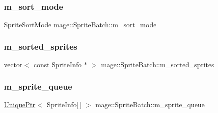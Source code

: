 \hypertarget{classmage_1_1_sprite_batch_a0b2b16b0d9eb63501b6fc0f9ce85e022}{}\label{classmage_1_1_sprite_batch_a0b2b16b0d9eb63501b6fc0f9ce85e022} 
\subsubsection{\texorpdfstring{m\+\_\+sort\+\_\+mode}{m\_sort\_mode}}
{\footnotesize\ttfamily \hyperlink{namespacemage_a256fa5833eecc408923de7ffadb5e014}{Sprite\+Sort\+Mode} mage\+::\+Sprite\+Batch\+::m\+\_\+sort\+\_\+mode\hspace{0.3cm}{\ttfamily [private]}}

\hypertarget{classmage_1_1_sprite_batch_a65ad09d31c928ab1522d8b2c0c509b9a}{}\label{classmage_1_1_sprite_batch_a65ad09d31c928ab1522d8b2c0c509b9a} 
\subsubsection{\texorpdfstring{m\+\_\+sorted\+\_\+sprites}{m\_sorted\_sprites}}
{\footnotesize\ttfamily vector$<$ const Sprite\+Info $\ast$ $>$ mage\+::\+Sprite\+Batch\+::m\+\_\+sorted\+\_\+sprites\hspace{0.3cm}{\ttfamily [private]}}

\hypertarget{classmage_1_1_sprite_batch_a67ab116e403b626771f03f527efa6f2f}{}\label{classmage_1_1_sprite_batch_a67ab116e403b626771f03f527efa6f2f} 
\subsubsection{\texorpdfstring{m\+\_\+sprite\+\_\+queue}{m\_sprite\_queue}}
{\footnotesize\ttfamily \hyperlink{namespacemage_a8c307fbcc33bce9b7f2aa4c26c3b95cf}{Unique\+Ptr}$<$ Sprite\+Info\mbox{[}$\,$\mbox{]} $>$ mage\+::\+Sprite\+Batch\+::m\+\_\+sprite\+\_\+queue\hspace{0.3cm}{\ttfamily [private]}}

